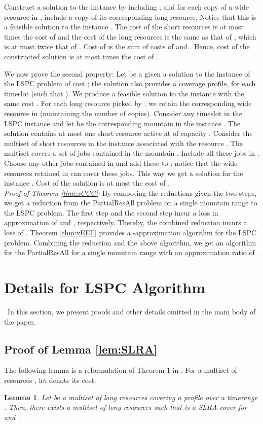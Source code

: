 \documentclass[11pt]{article}
\newtheorem{lemma}[theorem]{Lemma}
\newcommand{\PResAll}{{\sc PartialResAll}}
\newcommand{\lspc}{{\sc LSPC}}
\begin{document}
Construct a solution to the instance  by including ; 
and for each copy of a wide resource  in ,
include a copy of its corresponding long resource. Notice that this is a feasible solution to the instance .
The cost of the short resources  is at most  times the cost of 
and the cost of the long resources is the same as that of , which is at most twice that of .
Cost of  is the sum of costs of  and .
Hence, cost of the constructed solution is at most  times the cost of .

We now prove the second property:
Let  be a given a solution to the instance  of the {\lspc} problem of cost ;
the solution also provides a coverage profile,  for each timeslot  (such that ).
We produce a feasible solution  to the instance  with the same cost . 
For each long resource picked by , we retain the corresponding
wide resource in  (maintaining the number of copies).
Consider any timeslot  in the {\lspc} instance and let  be the corresponding mountain in the instance .
The solution  contains at most one short resource  active at  of capacity .
Consider the multiset of short resources  in the instance  associated with the resource .
The multiset  covers a set of  jobs contained in the mountain .
Include all these  jobs in . Choose any other  jobs contained in 
and add these to ; notice that the wide resources retained in  can cover these jobs.
This way we get a solution  for the instance .
Cost of the solution  is at most the cost of .
\\

\noindent
{\it Proof of Theorem \ref{thm:xCCC}: }
By composing the reductions given the two steps,
we get a reduction from the {\PResAll} problem on a single mountain range to the {\lspc} problem. 
The first step and the second step incur a loss in approximation of  and , respectively.
Thereby, the combined reduction incurs a loss of .
Theorem \ref{thm:xEEE} provides a -approximation algorithm for the {\lspc} problem.
Combining the reduction and the above algorithm, we get an algorithm for the {\PResAll} for a single mountain
range with an approximation ratio of .

\section{Details for {\lspc} Algorithm}
\label{sec:lspcdetails}\
In this section, we present proofs and other details omitted in the main body of the paper.

\subsection{Proof of Lemma \ref{lem:SLRA}}
The following lemma is a reformulation of Theorem 1 {in} \cite{esa2011}.
For a multiset of resources , let  denote its cost.
\begin{lemma}
\label{lem:esa-SLRA}
Let  be a multiset of long resources covering a profile  over a timerange .
Then, there exists a multiset of long resources  such that  is a SLRA cover for 
and . 
\end{lemma}
\end{document}
